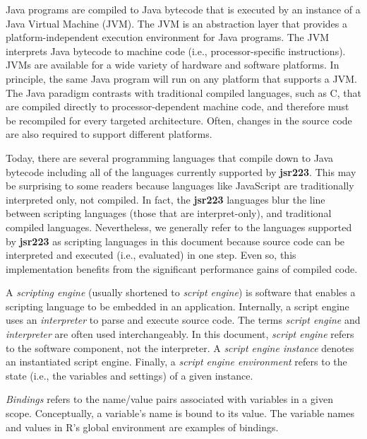 Java programs are compiled to Java bytecode that is executed by an instance of a Java Virtual Machine (JVM). The JVM is an abstraction layer that provides a platform-independent execution environment for Java programs. The JVM interprets Java bytecode to machine code (i.e., processor-specific instructions). JVMs are available for a wide variety of hardware and software platforms. In principle, the same Java program will run on any platform that supports a JVM. The Java paradigm contrasts with traditional compiled languages, such as C, that are compiled directly to processor-dependent machine code, and therefore must be recompiled for every targeted architecture. Often, changes in the source code are also required to support different platforms.

Today, there are several programming languages that compile down to Java bytecode including all of the languages currently supported by \textbf{jsr223}. This may be surprising to some readers because languages like JavaScript are traditionally interpreted only, not compiled. In fact, the \textbf{jsr223} languages blur the line between scripting languages (those that are interpret-only), and traditional compiled languages. Nevertheless, we generally refer to the languages supported by \textbf{jsr223} as scripting languages in this document because source code can be interpreted and executed (i.e., evaluated) in one step. Even so, this implementation benefits from the significant performance gains of compiled code.

A \textit{scripting engine} (usually shortened to \textit{script engine}) is software that enables a scripting language to be embedded in an application. Internally, a script engine uses an \textit{interpreter} to parse and execute source code. The terms \textit{script engine} and \textit{interpreter} are often used interchangeably. In this document, \textit{script engine} refers to the software component, not the interpreter. A \textit{script engine instance} denotes an instantiated script engine. Finally, a \textit{script engine environment} refers to the state (i.e., the variables and settings) of a given instance.

\textit{Bindings} refers to the name/value pairs associated with variables in a given scope. Conceptually, a variable's name is bound to its value. The variable names and values in R's global environment are examples of bindings.
